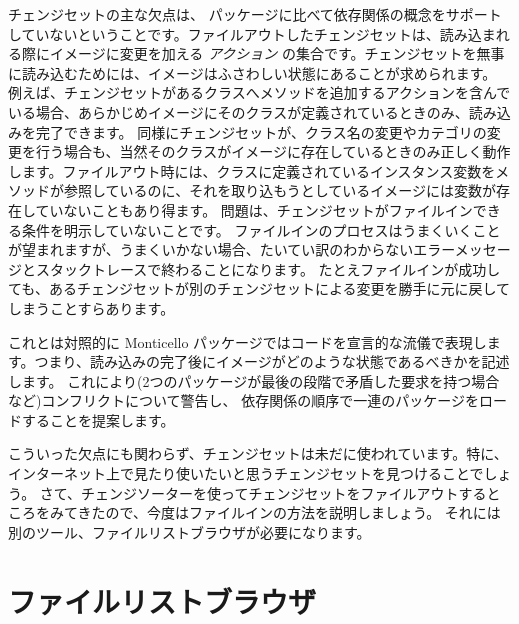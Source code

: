 \documentclass[a4paper,10pt,twoside]{book}
\begin{document}
チェンジセットの主な欠点は、 パッケージに比べて依存関係の概念をサポートしていないということです。ファイルアウトしたチェンジセットは、読み込まれる際にイメージに変更を加える \emph{アクション} の集合です。チェンジセットを無事に読み込むためには、イメージはふさわしい状態にあることが求められます。
例えば、チェンジセットがあるクラスへメソッドを追加するアクションを含んでいる場合、あらかじめイメージにそのクラスが定義されているときのみ、読み込みを完了できます。
同様にチェンジセットが、クラス名の変更やカテゴリの変更を行う場合も、当然そのクラスがイメージに存在しているときのみ正しく動作します。ファイルアウト時には、クラスに定義されているインスタンス変数をメソッドが参照しているのに、それを取り込もうとしているイメージには変数が存在していないこともあり得ます。
問題は、チェンジセットがファイルインできる条件を明示していないことです。
ファイルインのプロセスはうまくいくことが望まれますが、うまくいかない場合、たいてい訳のわからないエラーメッセージとスタックトレースで終わることになります。
たとえファイルインが成功しても、あるチェンジセットが別のチェンジセットによる変更を勝手に元に戻してしまうことすらあります。

これとは対照的に Monticello パッケージではコードを宣言的な流儀で表現します。つまり、読み込みの完了後にイメージがどのような状態であるべきかを記述します。
これにより(2つのパッケージが最後の段階で矛盾した要求を持つ場合など)コンフリクトについて警告し、
依存関係の順序で一連のパッケージをロードすることを提案します。

こういった欠点にも関わらず、チェンジセットは未だに使われています。特に、インターネット上で見たり使いたいと思うチェンジセットを見つけることでしょう。
さて、チェンジソーターを使ってチェンジセットをファイルアウトするところをみてきたので、今度はファイルインの方法を説明しましょう。
それには別のツール、ファイルリストブラウザが必要になります。


\section{ファイルリストブラウザ}
\end{document}
